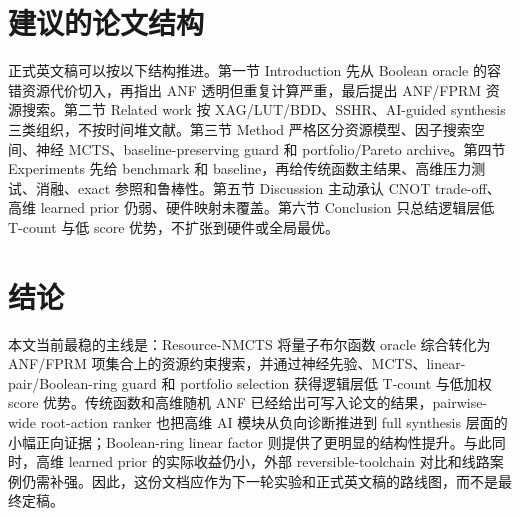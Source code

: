 \documentclass[UTF8,fontset=macnew,11pt]{ctexart}
\newcommand{\method}{Resource-NMCTS}
\begin{document}
\section{建议的论文结构}

正式英文稿可以按以下结构推进。第一节 Introduction 先从 Boolean oracle 的容错资源代价切入，再指出 ANF 透明但重复计算严重，最后提出 ANF/FPRM 资源搜索。第二节 Related work 按 XAG/LUT/BDD、SSHR、AI-guided synthesis 三类组织，不按时间堆文献。第三节 Method 严格区分资源模型、因子搜索空间、神经 MCTS、baseline-preserving guard 和 portfolio/Pareto archive。第四节 Experiments 先给 benchmark 和 baseline，再给传统函数主结果、高维压力测试、消融、exact 参照和鲁棒性。第五节 Discussion 主动承认 CNOT trade-off、高维 learned prior 仍弱、硬件映射未覆盖。第六节 Conclusion 只总结逻辑层低 T-count 与低 score 优势，不扩张到硬件或全局最优。

\section{结论}

本文当前最稳的主线是：\method{} 将量子布尔函数 oracle 综合转化为 ANF/FPRM 项集合上的资源约束搜索，并通过神经先验、MCTS、linear-pair/Boolean-ring guard 和 portfolio selection 获得逻辑层低 T-count 与低加权 score 优势。传统函数和高维随机 ANF 已经给出可写入论文的结果，pairwise-wide root-action ranker 也把高维 AI 模块从负向诊断推进到 full synthesis 层面的小幅正向证据；Boolean-ring linear factor 则提供了更明显的结构性提升。与此同时，高维 learned prior 的实际收益仍小，外部 reversible-toolchain 对比和线路案例仍需补强。因此，这份文档应作为下一轮实验和正式英文稿的路线图，而不是最终定稿。
\end{document}

